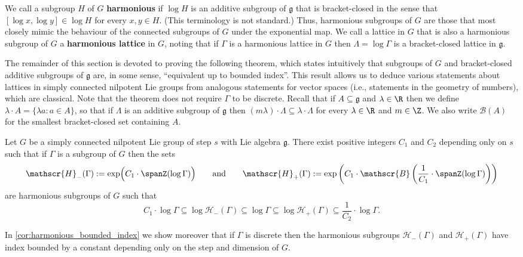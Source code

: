 %

We call a subgroup $H$ of $G$ \textbf{harmonious} if $\log H$ is an additive subgroup of $\mathfrak{g}$ that is bracket-closed in the sense that $[\log x, \log y]\in \log H$ for every $x,y\in H$. (This terminology is not standard.) Thus, harmonious subgroups of $G$ are those that most closely mimic the behaviour of the connected subgroups of $G$ under the exponential map. We call a lattice in $G$ that is also a harmonious subgroup of $G$ a \textbf{harmonious lattice} in $G$, noting that if $\Gamma$ is a harmonious lattice in $G$ then $\Lambda=\log \Gamma$ is a bracket-closed lattice in $\mathfrak{g}$.

\medskip



The remainder of this section is devoted to proving the following theorem, which states intuitively that subgroups of $G$ and bracket-closed additive subgroups of $\mathfrak{g}$ are, in some sense, ``equivalent up to bounded index''.  This result allows us to deduce various statements about lattices in simply connected nilpotent Lie groups from analogous statements for vector spaces (i.e., statements in the geometry of numbers), which are classical. Note that the theorem does not require $\Gamma$ to be discrete.
Recall that if $A \subseteq \mathfrak{g}$ and $\lambda \in \R$ then we define $\lambda \cdot A = \{\lambda a:a\in A\}$, so that if $\Lambda$ is an additive subgroup of $\mathfrak{g}$ then $(m\lambda) \cdot \Lambda \subseteq \lambda \cdot \Lambda$ for every $\lambda\in \R$ and $m\in \Z$. We also write $\mathscr{B}(A)$ for the smallest bracket-closed set containing $A$.

\begin{thm}
\label{thm:harmonious}
Let $G$ be a simply connected nilpotent Lie group of step $s$ with Lie algebra $\mathfrak{g}$. There exist  positive integers $C_1$ and $C_2$ depending only on $s$ such that if $\Gamma$ is a subgroup of $G$ then the sets
\[\mathscr{H}_-(\Gamma):= \exp\Bigr(C_1\cdot \spanZ(\log \Gamma)\Bigr)
%
%
%
\qquad\text{and}\qquad
\mathscr{H}_+(\Gamma):=\exp\left(C_1 \cdot \mathscr{B}\left(\frac{1}{C_1} \cdot \spanZ (\log \Gamma)\right)\right) \]
are harmonious subgroups of $G$ such that 
\[C_1 \cdot \log \Gamma \subseteq \log \mathscr{H}_-(\Gamma) \subseteq \log \Gamma \subseteq \log \mathscr{H}_+(\Gamma) \subseteq \frac{1}{C_2} \cdot \log \Gamma.\]
\end{thm}

In \cref{cor:harmonious_bounded_index} we show moreover that if $\Gamma$ is discrete then the harmonious subgroups $\mathscr{H}_-(\Gamma)$ and $\mathscr{H}_+(\Gamma)$ have index 
%
 bounded by a constant depending only on the step and dimension of $G$.
%


